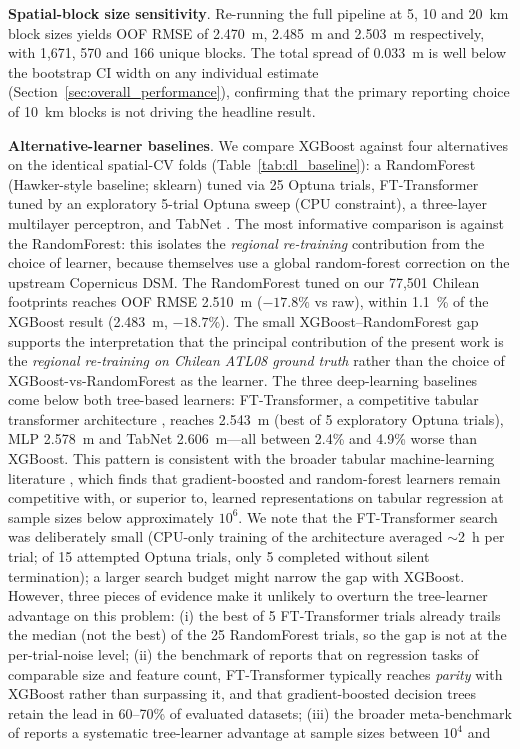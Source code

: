 \documentclass[preprint,authoryear,number]{elsarticle}
\begin{document}
\textbf{Spatial-block size sensitivity}. Re-running the full pipeline at 5, 10 and \SI{20}{\kilo\meter} block sizes yields OOF RMSE of \SI{2.470}{\meter}, \SI{2.485}{\meter} and \SI{2.503}{\meter} respectively, with 1{,}671, 570 and 166 unique blocks. The total spread of \SI{0.033}{\meter} is well below the bootstrap CI width on any individual estimate (Section~\ref{sec:overall_performance}), confirming that the primary reporting choice of \SI{10}{\kilo\meter} blocks is not driving the headline result.

\textbf{Alternative-learner baselines}. We compare XGBoost against four alternatives on the identical spatial-CV folds (Table~\ref{tab:dl_baseline}): a RandomForest (Hawker-style baseline; sklearn) tuned via 25 Optuna trials, FT-Transformer \citep{Gorishniy2021TabularDL} tuned by an exploratory 5-trial Optuna sweep (CPU constraint), a three-layer multilayer perceptron, and TabNet \citep{Arik2021TabNet}. The most informative comparison is against the RandomForest: this isolates the \emph{regional re-training} contribution from the choice of learner, because \citet{Hawker2022FABDEM} themselves use a global random-forest correction on the upstream Copernicus DSM. The RandomForest tuned on our 77{,}501 Chilean footprints reaches OOF RMSE \SI{2.510}{\meter} ($-17.8\%$ vs raw), within \SI{1.1}{\percent} of the XGBoost result (\SI{2.483}{\meter}, $-18.7\%$). The small XGBoost--RandomForest gap supports the interpretation that the principal contribution of the present work is the \emph{regional re-training on Chilean ATL08 ground truth} rather than the choice of XGBoost-vs-RandomForest as the learner. The three deep-learning baselines come below both tree-based learners: FT-Transformer, a competitive tabular transformer architecture \citep{Gorishniy2021TabularDL}, reaches \SI{2.543}{\meter} (best of 5 exploratory Optuna trials), MLP \SI{2.578}{\meter} and TabNet \SI{2.606}{\meter}---all between 2.4\% and 4.9\% worse than XGBoost. This pattern is consistent with the broader tabular machine-learning literature \citep{ShwartzZiv2022TabularDL,Grinsztajn2022TabularDL}, which finds that gradient-boosted and random-forest learners remain competitive with, or superior to, learned representations on tabular regression at sample sizes below approximately $10^{6}$. We note that the FT-Transformer search was deliberately small (CPU-only training of the architecture averaged $\sim$2~h per trial; of 15 attempted Optuna trials, only 5 completed without silent termination); a larger search budget might narrow the gap with XGBoost. However, three pieces of evidence make it unlikely to overturn the tree-learner advantage on this problem: (i) the best of 5 FT-Transformer trials already trails the median (not the best) of the 25 RandomForest trials, so the gap is not at the per-trial-noise level; (ii) the benchmark of \citet{Gorishniy2021TabularDL} reports that on regression tasks of comparable size and feature count, FT-Transformer typically reaches \emph{parity} with XGBoost rather than surpassing it, and that gradient-boosted decision trees retain the lead in 60--70\% of evaluated datasets; (iii) the broader meta-benchmark of \citet{Grinsztajn2022TabularDL} reports a systematic tree-learner advantage at sample sizes between $10^{4}$ and 
\end{document}
